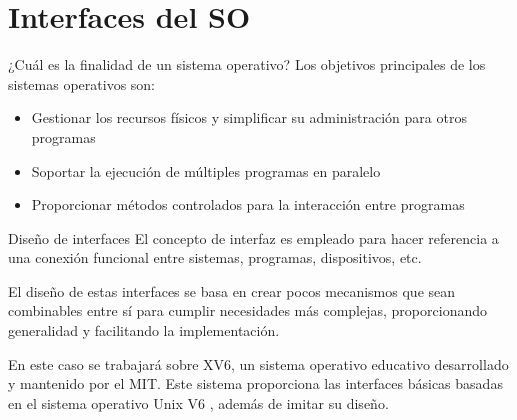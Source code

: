 \documentclass{libs/ufc_format}
\begin{document}
\section{Interfaces del SO}
\begin{frame}{¿Cuál es la finalidad de un sistema operativo?}
  Los objetivos principales de los sistemas operativos son:
  \begin{itemize}
    \item Gestionar los recursos físicos y simplificar su administración para otros programas
      \newline{}
    \item Soportar la ejecución de múltiples programas en paralelo
      \newline{}
    \item Proporcionar métodos controlados para la interacción entre programas
      \newline{}
  \end{itemize}
\end{frame}
\begin{frame}{Diseño de interfaces}
  El concepto de interfaz es empleado para hacer referencia a una conexión funcional entre sistemas, programas, dispositivos, etc. \cite{wiki:Interfaz}\newline

  \vspace{0.4cm}

  El diseño de estas interfaces se basa en crear pocos mecanismos que sean combinables entre sí para cumplir necesidades más complejas, proporcionando generalidad y facilitando la implementación.

  \vspace{0.4cm}

  En este caso se trabajará sobre XV6, un sistema operativo educativo desarrollado y mantenido por el MIT. Este sistema proporciona las interfaces básicas basadas en el sistema operativo Unix V6 \cite{xv6_book}, además de imitar su diseño.
\end{frame}
\end{document}
